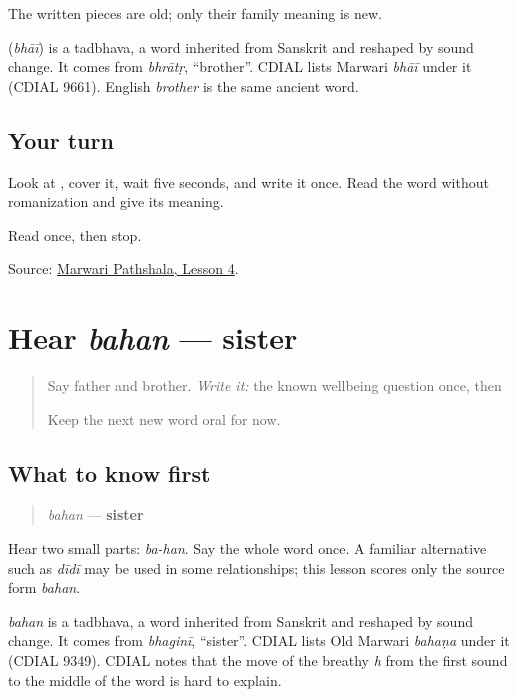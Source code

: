 The written pieces are old; only their family meaning is new.

\begin{cousinweb}
\textbf{} (\emph{bhāī}) is a tadbhava, a word inherited from Sanskrit and reshaped by sound change. It comes from \emph{bhrātṛ}, \textquotedblleft{}brother\textquotedblright{}. CDIAL lists Marwari \emph{bhāī} under it (CDIAL 9661). English \emph{brother} is the same ancient word.
\end{cousinweb}

\subsection*{Your turn}
Look at \textbf{}, cover it, wait five seconds, and write it once. Read the word without romanization and give its meaning.

\begin{tcolorbox}[breakable,colback=teal!4,colframe=teal!35!black,title={Before you move on}]
Read \textbf{} once, then stop.

Source: \href{https://www.marwaripathshala.com/marwari-lesson-4-english}{Marwari Pathshala, Lesson 4}.
\end{tcolorbox}
\section[bahan]{Hear \emph{bahan} — sister}

\label{lesson:MW-C08-hear-bahan}



\begin{quote}
Say father and brother. \emph{Write it:} the known wellbeing question once, then \textbf{}

Keep the next new word oral for now.
\end{quote}

\subsection*{What to know first}
\begin{quote}
\emph{bahan} — \textbf{sister}
\end{quote}

Hear two small parts: \emph{ba-han}. Say the whole word once. A familiar alternative such as \emph{dīdī} may be used in some relationships; this lesson scores only the source form \emph{bahan}.

\begin{cousinweb}
\emph{bahan} is a tadbhava, a word inherited from Sanskrit and reshaped by sound change. It comes from \emph{bhaginī}, \textquotedblleft{}sister\textquotedblright{}. CDIAL lists Old Marwari \emph{bahaṇa} under it (CDIAL 9349). CDIAL notes that the move of the breathy \emph{h} from the first sound to the middle of the word is hard to explain.
\end{cousinweb}

